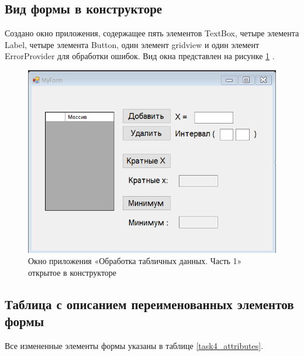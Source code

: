 \subsection{Вид формы в конструкторе}

Создано окно приложения, содержащее пять элементов TextBox, четыре элемента Label, четыре элемента Button, один элемент gridview и один элемент ErrorProvider для обработки ошибок. Вид окна представлен на рисунке \ref{task4_form} \cite{ахо2000структуры}.
\begin{figure}[H]
    \centering
    \includegraphics[width=0.8\linewidth]{lections/img/task4_form.png}
    \caption{Окно приложения «Обработка табличных данных. Часть 1» открытое в конструкторе}
    \label{task4_form}
\end{figure}


\subsection{Таблица с описанием переименованных элементов формы}
Все измененные элементы формы указаны в таблице \ref{task4_attributes}.


